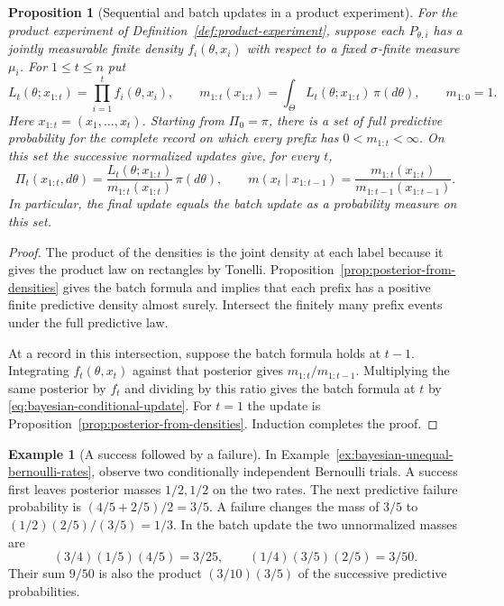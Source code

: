 \documentclass[11pt,oneside]{book}
\newtheorem{proposition}[theorem]{Proposition}
\theoremstyle{definition}
\newtheorem{example}[theorem]{Example}
\theoremstyle{remark}
\begin{document}
\begin{proposition}[Sequential and batch updates in a product experiment]
\label{prop:bayesian-batch-sequential}
For the product experiment of Definition~\ref{def:product-experiment},
suppose each $P_{\theta,i}$ has a jointly measurable finite density
$f_i(\theta,x_i)$ with respect to a fixed $\sigma$-finite measure
$\mu_i$. For $1\leq t\leq n$ put
\[
L_t(\theta;x_{1:t})=\prod_{i=1}^t f_i(\theta,x_i),\qquad
m_{1:t}(x_{1:t})=\int_\Theta L_t(\theta;x_{1:t})\,\pi(d\theta),
\qquad m_{1:0}=1.
\]
Here $x_{1:t}=(x_1,\ldots,x_t)$. Starting from $\Pi_0=\pi$,
there is a set of full predictive probability for the complete
record on which every prefix has $0<m_{1:t}<\infty$. On this set
the successive normalized updates give, for every $t$,
\[
\Pi_t(x_{1:t},d\theta)
=\frac{L_t(\theta;x_{1:t})}{m_{1:t}(x_{1:t})}\,\pi(d\theta),
\qquad
m(x_t\mid x_{1:t-1})
=\frac{m_{1:t}(x_{1:t})}{m_{1:t-1}(x_{1:t-1})}.
\]
In particular, the final update equals the batch update as a
probability measure on this set.
\end{proposition}
\begin{proof}
The product of the densities is the joint density at each label
because it gives the product law on rectangles by Tonelli.
Proposition~\ref{prop:posterior-from-densities} gives the batch formula
and implies that each prefix has a positive finite predictive density
almost surely. Intersect the finitely many prefix events under the full
predictive law.

At a record in this intersection, suppose the batch formula holds at
$t-1$. Integrating $f_t(\theta,x_t)$ against that posterior gives
$m_{1:t}/m_{1:t-1}$. Multiplying the same posterior by $f_t$ and
dividing by this ratio gives the batch formula at $t$ by
\eqref{eq:bayesian-conditional-update}. For $t=1$ the update is
Proposition~\ref{prop:posterior-from-densities}. Induction completes
the proof.
\end{proof}

\begin{example}[A success followed by a failure]
\label{ex:bayesian-sequential-two-rates}
In Example~\ref{ex:bayesian-unequal-bernoulli-rates}, observe two
conditionally independent Bernoulli trials. A success first leaves
posterior masses $1/2,1/2$ on the two rates. The next predictive
failure probability is $(4/5+2/5)/2=3/5$. A failure changes the mass
of $3/5$ to $(1/2)(2/5)/(3/5)=1/3$. In the batch update the two
unnormalized masses are
\[
(3/4)(1/5)(4/5)=3/25,\qquad
(1/4)(3/5)(2/5)=3/50.
\]
Their sum $9/50$ is also the product $(3/10)(3/5)$ of the
successive predictive probabilities.
\end{example}
\end{document}
